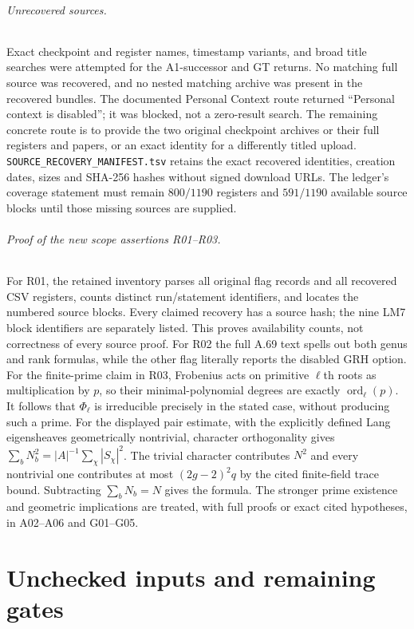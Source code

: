 \documentclass[11pt,a4paper]{article}
\begin{document}
\paragraph{Unrecovered sources.}
Exact checkpoint and register names, timestamp variants, and broad
title searches were attempted for the A1-successor and GT returns.
No matching full source was recovered, and no nested matching archive
was present in the recovered bundles. The documented Personal Context
route returned ``Personal context is disabled''; it was blocked,
not a zero-result search. The remaining concrete route is to provide
the two original checkpoint archives or their full registers and papers,
or an exact identity for a differently titled upload.
\texttt{SOURCE\_RECOVERY\_MANIFEST.tsv} retains the exact recovered
identities, creation dates, sizes and SHA-256 hashes without signed
download URLs. The ledger's coverage statement must remain
$800/1190$ registers and $591/1190$ available source blocks until those
missing sources are supplied.

\paragraph{Proof of the new scope assertions R01--R03.}
For R01, the retained inventory parses all original flag records and
all recovered CSV registers, counts distinct run/statement identifiers,
and locates the numbered source blocks. Every claimed recovery has a
source hash; the nine LM7 block identifiers are separately listed.
This proves availability counts, not correctness of every source proof.
For R02 the full A.69 text spells out both genus and rank formulas,
while the other flag literally reports the disabled GRH option.
For the finite-prime claim in R03, Frobenius acts on primitive
$\ell$th roots as multiplication by $p$, so their minimal-polynomial
degrees are exactly $\operatorname{ord}_\ell(p)$. It follows that
$\Phi_\ell$ is irreducible precisely in the stated case, without
producing such a prime. For the displayed pair estimate, with the explicitly defined Lang
eigensheaves geometrically nontrivial, character
orthogonality gives $\sum_bN_b^2=|A|^{-1}\sum_\chi|S_\chi|^2$.
The trivial character contributes $N^2$ and every nontrivial one
contributes at most $(2g-2)^2q$ by the cited finite-field trace bound.
Subtracting $\sum_bN_b=N$ gives the formula. The stronger prime
existence and geometric implications are treated, with full proofs
or exact cited hypotheses, in A02--A06 and G01--G05.
\clearpage
\part{Unchecked inputs and remaining gates}
\end{document}
